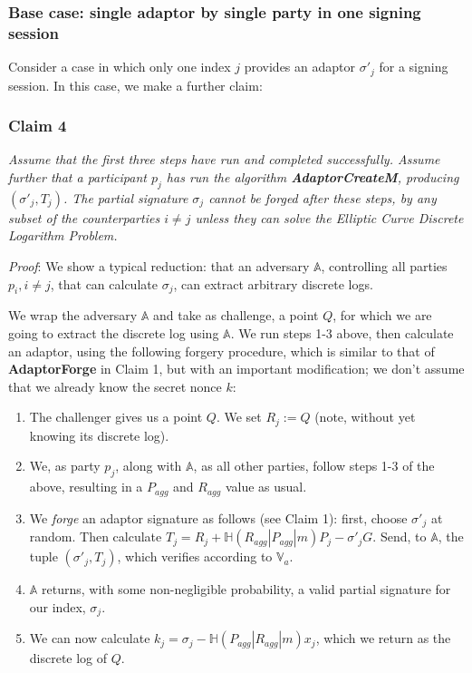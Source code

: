 \documentclass[10pt,a4paper]{article}
\begin{document}
\subsubsection{Base case: single adaptor by single party in one signing session}

Consider a case in which only one index $j$ provides an adaptor $\sigma'_j$ for a signing session. In this case, we make a further claim:

\subsubsection{Claim 4}
\emph{Assume that the first three steps have run and completed successfully. Assume further that a participant $p_j$ has run the algorithm \textbf{AdaptorCreateM}, producing $(\sigma'_j, T_j)$. The partial signature $\sigma_j$ cannot be forged after these steps, by any subset of the counterparties $i \neq j$ unless they can solve the Elliptic Curve Discrete Logarithm Problem.}

\vspace{5 pt}
\emph{Proof}: We show a typical reduction: that an adversary $\mathbb{A}$, controlling all parties $p_i, i \neq j$, that can calculate $\sigma_j$, can extract arbitrary discrete logs.

\vspace{5 pt}
We wrap the adversary $\mathbb{A}$ and take as challenge, a point $Q$, for which we are going to extract the discrete log using $\mathbb{A}$. We run steps 1-3 above, then calculate an adaptor, using the following forgery procedure, which is similar to that of \textbf{AdaptorForge} in Claim 1, but with an important modification; we don't assume that we already know the secret nonce $k$:

\begin{enumerate}
\item The challenger gives us a point $Q$. We set $R_j := Q$ (note, without yet knowing its discrete log).
\item We, as party $p_j$, along with $\mathbb{A}$, as all other parties, follow steps 1-3 of the above, resulting in a $P_{agg}$ and $R_{agg}$ value as usual.
\item We \emph{forge} an adaptor signature as follows (see Claim 1): first, choose $\sigma'_j$ at random. Then calculate $T_j = R_j + \mathbb{H}(R_{agg}|P_{agg}|m)P_j - \sigma'_j G$. Send, to $\mathbb{A}$, the tuple $(\sigma'_j, T_j)$, which verifies according to $\mathbb{V}_a$.
\item $\mathbb{A}$ returns, with some non-negligible probability, a valid partial signature for our index, $\sigma_j$.
\item We can now calculate $k_j = \sigma_j - \mathbb{H}(P_{agg}|R_{agg}|m)x_j$, which we return as the discrete log of $Q$.
\end{enumerate}
\end{document}
